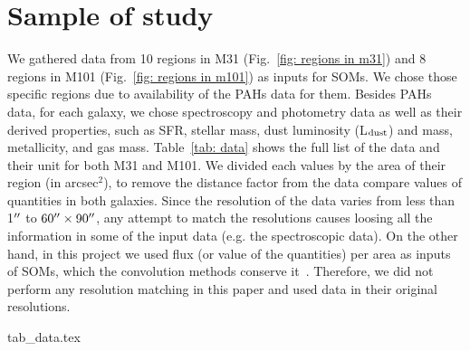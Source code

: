 
\section{Sample of study}
\label{Sec: data_SOMN}

We gathered data from 10 regions in M31 (Fig.~\ref{fig: regions in m31}) and 8 regions in M101 (Fig.~\ref{fig: regions in m101}) as inputs for SOMs.
We chose those specific regions due to availability of the PAHs data for them.
Besides PAHs data, for each galaxy, we chose spectroscopy and photometry data as well as their derived properties, such as SFR, stellar mass, dust luminosity (L$_{\rm dust}$) and mass, metallicity, and gas mass.
Table~\ref{tab: data} shows the full list of the data and their unit for both M31 and M101.
We divided each values by the area of their region (in arcsec$^2$), to remove the distance factor from the data compare values of quantities in both galaxies.
Since the resolution of the data varies from less than 1$\hbox{$^{\prime\prime}$}$ to $60\hbox{$^{\prime\prime}$} \times 90 \hbox{$^{\prime\prime}$}$, any attempt to match the resolutions causes loosing all the information in some of the input data (e.g. the spectroscopic data).
On the other hand, in this project we used flux (or value of the quantities) per area as inputs of SOMs, which the convolution methods conserve it~\citep{Aniano12}.
Therefore, we did not perform any resolution matching in this paper and used data in their original resolutions.


{tab_data.tex}


